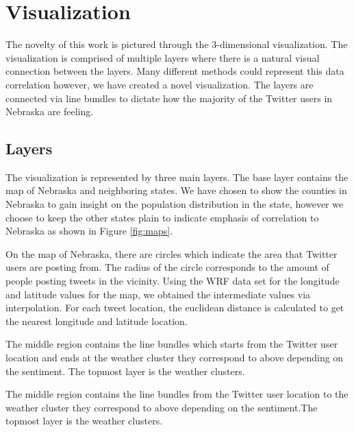 \documentclass[journal]{vgtc}                %
\begin{document}
\section{Visualization}
\label{sec:vis}

The novelty of this work is pictured through the 3-dimensional visualization. The visualization is comprised of multiple layers where there is a natural visual connection between the layers. Many different methods could represent this data correlation however, we have created a novel visualization. The layers are connected via line bundles to dictate how the majority of the Twitter users in Nebraska are feeling.

\subsection{Layers}
The visualization is represented by three main layers. The base layer contains the map of Nebraska and neighboring states. We have chosen to show the counties in Nebraska to gain insight on the population distribution in the state, however we choose to keep the other states plain to indicate emphasis of correlation to Nebraska as shown in Figure \ref{fig:maps}.

On the map of Nebraska, there are circles which indicate the area that Twitter users are posting from. The radius of the circle corresponds to the amount of people posting tweets in the vicinity. Using the WRF data set for the longitude and latitude values for the map, we obtained the intermediate values via interpolation. For each tweet location, the euclidean distance is calculated to get the nearest longitude and latitude location.

The middle region contains the line bundles which starts from the Twitter user location and ends at the weather cluster they correspond to above depending on the sentiment. The topmost layer is the weather clusters.

The middle region contains the line bundles from the Twitter user location to the weather cluster they correspond to above depending on the sentiment.The topmost layer is the weather clusters.
\end{document}

